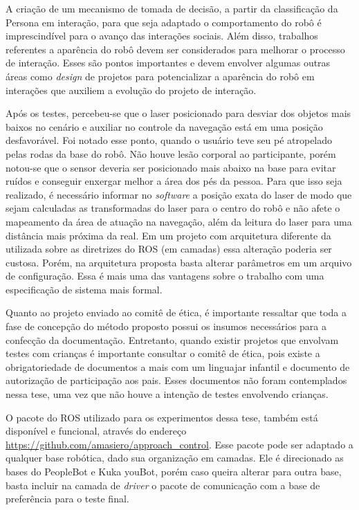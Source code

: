 A criação de um mecanismo de tomada de decisão, a partir da classificação da Persona em interação, para que seja adaptado o comportamento do robô é imprescindível para o avanço das interações sociais. Além disso, trabalhos referentes a aparência do robô devem ser considerados para melhorar o processo de interação. Esses são pontos importantes e devem envolver algumas outras áreas como \textit{design} de projetos para potencializar a aparência do robô em interações que auxiliem a evolução do projeto de interação.

Após os testes, percebeu-se que o laser posicionado para desviar dos objetos mais baixos no cenário e auxiliar no controle da navegação está em uma posição desfavorável. Foi notado esse ponto, quando o usuário teve seu pé atropelado pelas rodas da base do robô. Não houve lesão corporal ao participante, porém notou-se que o sensor deveria ser posicionado mais abaixo na base para evitar ruídos e conseguir enxergar melhor a área dos pés da pessoa. Para que isso seja realizado, é necessário informar no \textit{software} a posição exata do laser de modo que sejam calculadas as transformadas do laser para o centro do robô e não afete o mapeamento da área de atuação na navegação, além da leitura do laser para uma distância mais próxima da real. Em um projeto com arquitetura diferente da utilizada sobre as diretrizes do ROS (em camadas) essa alteração poderia ser custosa. Porém, na arquitetura proposta basta alterar parâmetros em um arquivo de configuração. Essa é mais uma das vantagens sobre o trabalho com uma especificação de sistema mais formal.

Quanto ao projeto enviado ao comitê de ética, é importante ressaltar que toda a fase de concepção do método proposto possui os insumos necessários para a confecção da documentação. Entretanto, quando existir projetos que envolvam testes com crianças é importante consultar o comitê de ética, pois existe a obrigatoriedade de documentos a mais com um linguajar infantil e documento de autorização de participação aos pais. Esses documentos não foram contemplados nessa tese, uma vez que não houve a intenção de testes envolvendo crianças.

O pacote do ROS utilizado para os experimentos dessa tese, também está disponível e funcional, através do endereço \url{https://github.com/amasiero/approach\_control}. Esse pacote pode ser adaptado a qualquer base robótica, dado sua organização em camadas. Ele é direcionado as bases do PeopleBot e Kuka youBot, porém caso queira alterar para outra base, basta incluir na camada de \textit{driver} o pacote de comunicação com a base de preferência para o teste final.

